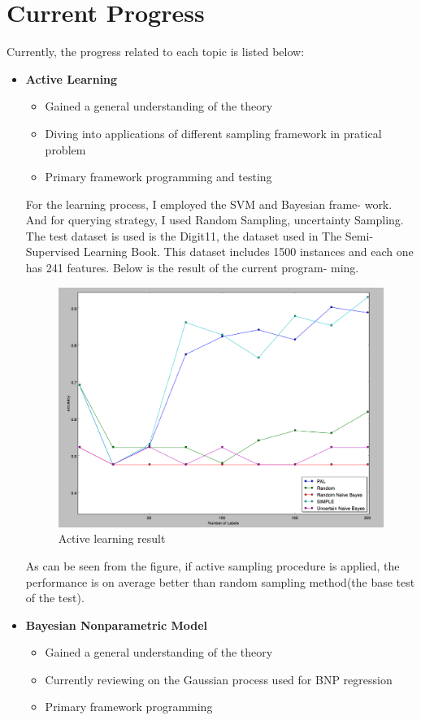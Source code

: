 \section{Current Progress}
Currently, the progress related to each topic is listed below:
\begin{itemize}

\item \textbf{Active Learning}
 \begin{itemize}
  \item Gained a general understanding of the theory
  \item Diving into applications of different sampling framework in pratical problem
  \item Primary framework programming and testing 
 \end{itemize}
 
 
 For the learning process, I employed the SVM and Bayesian frame- work. And for querying strategy, I used Random Sampling, uncertainty Sampling. The test dataset is used is the Digit11, the dataset used in The Semi-Supervised Learning Book. This dataset includes 1500 instances and each one has 241 features. Below is the result of the current program- ming.
 \begin{figure}[htbp]
  \includegraphics[scale=0.3]{activelearning/report}
  \caption{Active learning result}
 \end{figure}

As can be seen from the figure, if active sampling procedure is applied, the performance is on average better than random sampling method(the base test of the test). 


\item \textbf{Bayesian Nonparametric Model}
 \begin{itemize}
  \item Gained a general understanding of the theory
  \item Currently reviewing on the Gaussian process used for BNP regression
  \item Primary framework programming 
 \end{itemize}
 \end{itemize}